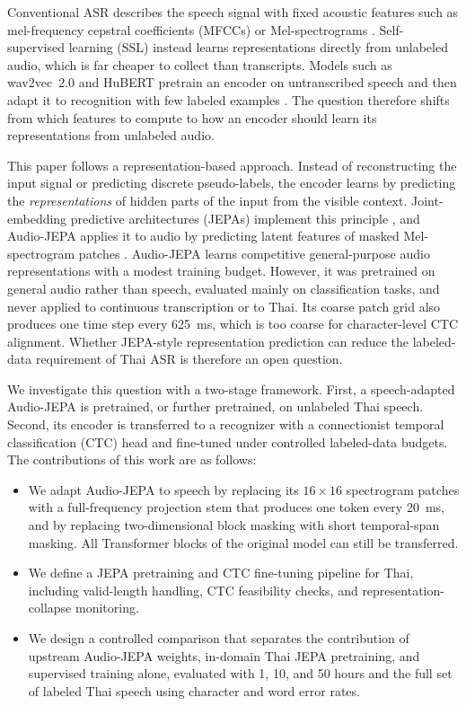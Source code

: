 \documentclass[conference]{IEEEtran}
\begin{document}
Conventional ASR describes the speech signal with fixed acoustic features such as mel-frequency cepstral coefficients (MFCCs) or Mel-spectrograms \cite{davis1980mfcc}. Self-supervised learning (SSL) instead learns representations directly from unlabeled audio, which is far cheaper to collect than transcripts. Models such as wav2vec~2.0 and HuBERT pretrain an encoder on untranscribed speech and then adapt it to recognition with few labeled examples \cite{baevski2020wav2vec2,hsu2021hubert}. The question therefore shifts from which features to compute to how an encoder should learn its representations from unlabeled audio.

This paper follows a representation-based approach. Instead of reconstructing the input signal or predicting discrete pseudo-labels, the encoder learns by predicting the \emph{representations} of hidden parts of the input from the visible context. Joint-embedding predictive architectures (JEPAs) implement this principle \cite{lecun2022path,assran2023ijepa}, and Audio-JEPA applies it to audio by predicting latent features of masked Mel-spectrogram patches \cite{tuncay2025audiojepa}. Audio-JEPA learns competitive general-purpose audio representations with a modest training budget. However, it was pretrained on general audio rather than speech, evaluated mainly on classification tasks, and never applied to continuous transcription or to Thai. Its coarse patch grid also produces one time step every 625~ms, which is too coarse for character-level CTC alignment. Whether JEPA-style representation prediction can reduce the labeled-data requirement of Thai ASR is therefore an open question.

We investigate this question with a two-stage framework. First, a speech-adapted Audio-JEPA is pretrained, or further pretrained, on unlabeled Thai speech. Second, its encoder is transferred to a recognizer with a connectionist temporal classification (CTC) head \cite{graves2006ctc} and fine-tuned under controlled labeled-data budgets. The contributions of this work are as follows:
\begin{itemize}
\item We adapt Audio-JEPA to speech by replacing its $16\times16$ spectrogram patches with a full-frequency projection stem that produces one token every 20~ms, and by replacing two-dimensional block masking with short temporal-span masking. All Transformer blocks of the original model can still be transferred.
\item We define a JEPA pretraining and CTC fine-tuning pipeline for Thai, including valid-length handling, CTC feasibility checks, and representation-collapse monitoring.
\item We design a controlled comparison that separates the contribution of upstream Audio-JEPA weights, in-domain Thai JEPA pretraining, and supervised training alone, evaluated with 1, 10, and 50 hours and the full set of labeled Thai speech using character and word error rates.
\end{itemize}
\end{document}
